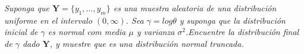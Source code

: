 \documentclass[11pt,letterpaper]{article}
\begin{document}
\begin{tcolorbox}[
    title = \textcolor{white}{\textbf{Problema 5}},
    colbacktitle=AzulUNAM!95!black,         %
    coltitle=white,                         %
    colback=OroUNAM!7!white,                %
    colframe=OroUNAM!90!black,              %
    fontupper=\small
]
\textit{Suponga que $\textbf{Y}=\{y_1, . . . , y_m\}$ es una muestra aleatoria de una
distribuci\'on uniforme en el intervalo $(0,\infty)$. Sea $\gamma= log\theta$ y suponga
que la distribuci\'on inicial de $\gamma$ es normal com media $\mu$ y varianza $\sigma^2$.Encuentre la distribuci\'on final de $\gamma$ dado $\textbf{Y}$, y muestre que es una
distribuci\'on normal truncada.}
\end{tcolorbox}
\end{document}
